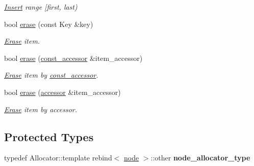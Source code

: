 \begin{DoxyCompactItemize}
\begin{DoxyCompactList}\small\item\em \hyperlink{structInsert}{Insert} range \mbox{[}first, last) \end{DoxyCompactList}\item 
bool \hyperlink{classtbb_1_1interface5_1_1concurrent__hash__map_a5144122dbb946d933b94a92117543b33}{erase} (const Key \&key)
\begin{DoxyCompactList}\small\item\em \hyperlink{structErase}{Erase} item. \end{DoxyCompactList}\item 
bool \hyperlink{classtbb_1_1interface5_1_1concurrent__hash__map_a52cd8c021eab3d09e75383064ca7d80a}{erase} (\hyperlink{classtbb_1_1interface5_1_1concurrent__hash__map_1_1const__accessor}{const\+\_\+accessor} \&item\+\_\+accessor)
\begin{DoxyCompactList}\small\item\em \hyperlink{structErase}{Erase} item by \hyperlink{classtbb_1_1interface5_1_1concurrent__hash__map_1_1const__accessor}{const\+\_\+accessor}. \end{DoxyCompactList}\item 
bool \hyperlink{classtbb_1_1interface5_1_1concurrent__hash__map_ae8ae6006f9756f3bfd9b5d4407250ada}{erase} (\hyperlink{classtbb_1_1interface5_1_1concurrent__hash__map_1_1accessor}{accessor} \&item\+\_\+accessor)
\begin{DoxyCompactList}\small\item\em \hyperlink{structErase}{Erase} item by accessor. \end{DoxyCompactList}\end{DoxyCompactItemize}
\subsection*{Protected Types}
\begin{DoxyCompactItemize}
\item 
\hypertarget{classtbb_1_1interface5_1_1concurrent__hash__map_ab98f8222c91dbde0852a7389dc35b60f}{}typedef Allocator\+::template rebind$<$ \hyperlink{structtbb_1_1interface5_1_1concurrent__hash__map_1_1node}{node} $>$\+::other {\bfseries node\+\_\+allocator\+\_\+type}\label{classtbb_1_1interface5_1_1concurrent__hash__map_ab98f8222c91dbde0852a7389dc35b60f}

\end{DoxyCompactItemize}
